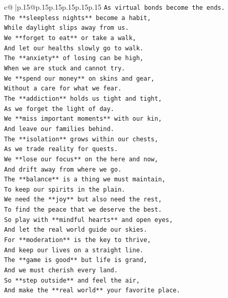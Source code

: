 \documentclass{article}
\begin{document}
{\begin{supertabular}{c@{$\;$}|p{.15\linewidth}@{}p{.15\linewidth}p{.15\linewidth}p{.15\linewidth}p{.15\linewidth}p{.15\linewidth}}
{{{\texttt{As virtual bonds become the ends.} \\
\texttt{The **sleepless nights** become a habit,} \\
\texttt{While daylight slips away from us.} \\
\texttt{We **forget to eat** or take a walk,} \\
\texttt{And let our healths slowly go to walk.} \\
\texttt{The **anxiety** of losing can be high,} \\
\texttt{When we are stuck and cannot try.} \\
\texttt{We **spend our money** on skins and gear,} \\
\texttt{Without a care for what we fear.} \\
\texttt{The **addiction** holds us tight and tight,} \\
\texttt{As we forget the light of day.} \\
\texttt{We **miss important moments** with our kin,} \\
\texttt{And leave our families behind.} \\
\texttt{The **isolation** grows within our chests,} \\
\texttt{As we trade reality for quests.} \\
\texttt{We **lose our focus** on the here and now,} \\
\texttt{And drift away from where we go.} \\
\texttt{The **balance** is a thing we must maintain,} \\
\texttt{To keep our spirits in the plain.} \\
\texttt{We need the **joy** but also need the rest,} \\
\texttt{To find the peace that we deserve the best.} \\
\texttt{So play with **mindful hearts** and open eyes,} \\
\texttt{And let the real world guide our skies.} \\
\texttt{For **moderation** is the key to thrive,} \\
\texttt{And keep our lives on a straight line.} \\
\texttt{The **game is good** but life is grand,} \\
\texttt{And we must cherish every land.} \\
\texttt{So **step outside** and feel the air,} \\
\texttt{And make the **real world** your favorite place.} \\
}}}
\end{supertabular}}
\end{document}
